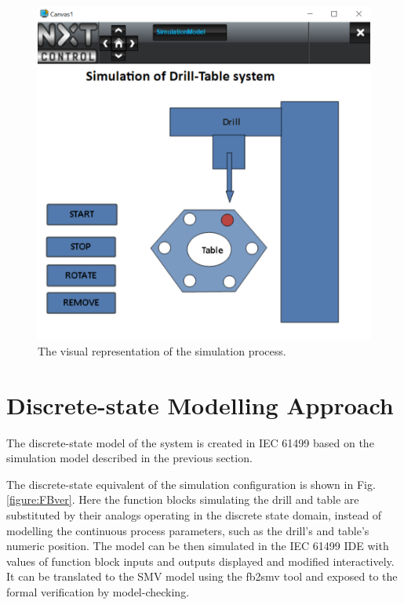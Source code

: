 \begin{bibunit}
\begin{figure}[h]
    \centering
    \includegraphics[scale = 0.30]{MX_Papers/Paper2/images/DT_HMI5.PNG}
    \caption{The visual representation of the simulation process.}
    \label{figure:SimulationDiagram}
\end{figure}

\section{Discrete-state Modelling Approach}\label{sec:discrete_state}

The discrete-state model of the system is created in IEC 61499 based on the simulation model described in the previous section. 

The discrete-state equivalent of the simulation configuration is shown in Fig. \ref{figure:FBver}. Here the function blocks simulating the drill and table are substituted by their analogs operating in the discrete state domain, instead of modelling the continuous process parameters, such as the drill's and table's numeric position.
The model can be then simulated in the IEC 61499 IDE with values of function block inputs and outputs displayed and modified interactively. It can be translated to the SMV model using the fb2smv tool and exposed to the formal verification by model-checking. 


\end{bibunit}
